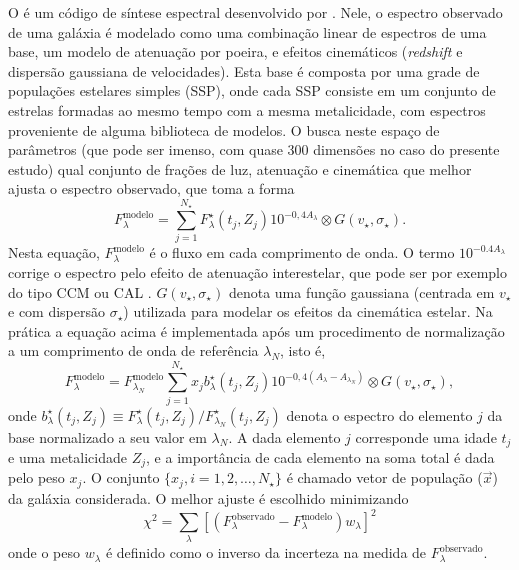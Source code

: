 O \starlight é um código de síntese espectral desenvolvido por
\citet{CidFernandes2005}. Nele, o espectro observado de uma galáxia é modelado
como uma combinação linear de espectros de uma base, um modelo de atenuação por
poeira, e efeitos cinemáticos ({\em redshift} e dispersão gaussiana de
velocidades). Esta base é composta por uma grade de populações estelares simples
(SSP), onde cada SSP consiste em um conjunto de estrelas formadas ao mesmo tempo
com a mesma metalicidade, com espectros proveniente de alguma biblioteca de
modelos. O \starlight busca neste espaço de parâmetros (que pode ser imenso, com
quase 300 dimensões no caso do presente estudo) qual conjunto de frações de luz,
atenuação e cinemática que melhor ajusta o espectro observado, que toma a forma
\begin{equation*}
F^{\mathrm{modelo}}_\lambda = \sum_{j=1}^{N_\star} F^\star_\lambda(t_j,Z_j)
10^{ -0,4 A_\lambda}  \otimes G(v_\star,\sigma_\star).
\end{equation*}	
Nesta equação, $F^{\mathrm{modelo}}_\lambda$ é o fluxo em cada comprimento de
onda. O termo $10^{ -0.4 A_\lambda}$ corrige o espectro pelo efeito de atenuação
interestelar, que pode ser por exemplo do tipo CCM \citep*{Cardelli1989} ou
CAL \citep*{Calzetti1994}. $G(v_\star,\sigma_\star)$ denota uma função
gaussiana (centrada em $v_\star$ e com dispersão $\sigma_\star$) utilizada para
modelar os efeitos da cinemática estelar. Na prática a equação acima é
implementada após um procedimento de normalização a um comprimento de onda de
referência $\lambda_N$, isto é,
\begin{equation*}
F^{\mathrm{modelo}}_\lambda = F^{\mathrm{modelo}}_{\lambda_N} 
\sum_{j=1}^{N_\star} x_j b^\star_\lambda(t_j,Z_j)
10^{ -0,4 (A_\lambda - A_{\lambda_N}) } \otimes G(v_\star,\sigma_\star),
\end{equation*}
onde $b^\star_\lambda(t_j,Z_j) \equiv  F^\star_\lambda(t_j,Z_j) /
F^\star_{\lambda_N}(t_j,Z_j)$ denota o espectro  do elemento $j$ da base
normalizado a seu valor em $\lambda_N$. A dada elemento $j$ corresponde uma
idade  $t_j$ e uma metalicidade $Z_j$, e a importância de cada elemento na soma
total é dada pelo peso $x_j$. O conjunto $\{x_j, i=1,2,\ldots,N_\star\}$ é
chamado vetor de população ($\vec{x}$) da galáxia considerada.
O melhor ajuste é escolhido minimizando
\begin{equation*}
\chi^2 = \sum_\lambda \left[(F^{\mathrm{observado}}_\lambda -
F^{\mathrm{modelo}}_\lambda) w_\lambda\right]^2
\end{equation*}
onde o peso $w_\lambda$ é definido como o inverso da incerteza na medida de
$F_\lambda^{\mathrm{observado}}$.


